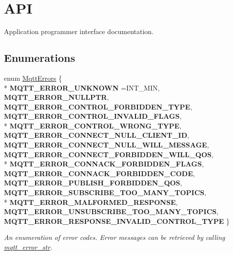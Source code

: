 \hypertarget{group__api}{}\section{A\+PI}
\label{group__api}


Application programmer interface documentation.  


\subsection*{Enumerations}
\begin{DoxyCompactItemize}
\item 
enum \hyperlink{group__api_gabfef25ed21446904fd8b3a71cfa1f203}{Mqtt\+Errors} \{ \\*
{\bfseries M\+Q\+T\+T\+\_\+\+E\+R\+R\+O\+R\+\_\+\+U\+N\+K\+N\+O\+WN} =I\+N\+T\+\_\+\+M\+IN, 
{\bfseries M\+Q\+T\+T\+\_\+\+E\+R\+R\+O\+R\+\_\+\+N\+U\+L\+L\+P\+TR}, 
{\bfseries M\+Q\+T\+T\+\_\+\+E\+R\+R\+O\+R\+\_\+\+C\+O\+N\+T\+R\+O\+L\+\_\+\+F\+O\+R\+B\+I\+D\+D\+E\+N\+\_\+\+T\+Y\+PE}, 
{\bfseries M\+Q\+T\+T\+\_\+\+E\+R\+R\+O\+R\+\_\+\+C\+O\+N\+T\+R\+O\+L\+\_\+\+I\+N\+V\+A\+L\+I\+D\+\_\+\+F\+L\+A\+GS}, 
\\*
{\bfseries M\+Q\+T\+T\+\_\+\+E\+R\+R\+O\+R\+\_\+\+C\+O\+N\+T\+R\+O\+L\+\_\+\+W\+R\+O\+N\+G\+\_\+\+T\+Y\+PE}, 
{\bfseries M\+Q\+T\+T\+\_\+\+E\+R\+R\+O\+R\+\_\+\+C\+O\+N\+N\+E\+C\+T\+\_\+\+N\+U\+L\+L\+\_\+\+C\+L\+I\+E\+N\+T\+\_\+\+ID}, 
{\bfseries M\+Q\+T\+T\+\_\+\+E\+R\+R\+O\+R\+\_\+\+C\+O\+N\+N\+E\+C\+T\+\_\+\+N\+U\+L\+L\+\_\+\+W\+I\+L\+L\+\_\+\+M\+E\+S\+S\+A\+GE}, 
{\bfseries M\+Q\+T\+T\+\_\+\+E\+R\+R\+O\+R\+\_\+\+C\+O\+N\+N\+E\+C\+T\+\_\+\+F\+O\+R\+B\+I\+D\+D\+E\+N\+\_\+\+W\+I\+L\+L\+\_\+\+Q\+OS}, 
\\*
{\bfseries M\+Q\+T\+T\+\_\+\+E\+R\+R\+O\+R\+\_\+\+C\+O\+N\+N\+A\+C\+K\+\_\+\+F\+O\+R\+B\+I\+D\+D\+E\+N\+\_\+\+F\+L\+A\+GS}, 
{\bfseries M\+Q\+T\+T\+\_\+\+E\+R\+R\+O\+R\+\_\+\+C\+O\+N\+N\+A\+C\+K\+\_\+\+F\+O\+R\+B\+I\+D\+D\+E\+N\+\_\+\+C\+O\+DE}, 
{\bfseries M\+Q\+T\+T\+\_\+\+E\+R\+R\+O\+R\+\_\+\+P\+U\+B\+L\+I\+S\+H\+\_\+\+F\+O\+R\+B\+I\+D\+D\+E\+N\+\_\+\+Q\+OS}, 
{\bfseries M\+Q\+T\+T\+\_\+\+E\+R\+R\+O\+R\+\_\+\+S\+U\+B\+S\+C\+R\+I\+B\+E\+\_\+\+T\+O\+O\+\_\+\+M\+A\+N\+Y\+\_\+\+T\+O\+P\+I\+CS}, 
\\*
{\bfseries M\+Q\+T\+T\+\_\+\+E\+R\+R\+O\+R\+\_\+\+M\+A\+L\+F\+O\+R\+M\+E\+D\+\_\+\+R\+E\+S\+P\+O\+N\+SE}, 
{\bfseries M\+Q\+T\+T\+\_\+\+E\+R\+R\+O\+R\+\_\+\+U\+N\+S\+U\+B\+S\+C\+R\+I\+B\+E\+\_\+\+T\+O\+O\+\_\+\+M\+A\+N\+Y\+\_\+\+T\+O\+P\+I\+CS}, 
{\bfseries M\+Q\+T\+T\+\_\+\+E\+R\+R\+O\+R\+\_\+\+R\+E\+S\+P\+O\+N\+S\+E\+\_\+\+I\+N\+V\+A\+L\+I\+D\+\_\+\+C\+O\+N\+T\+R\+O\+L\+\_\+\+T\+Y\+PE}
 \}\begin{DoxyCompactList}\small\item\em An enumeration of error codes. Error messages can be retrieved by calling \hyperlink{group__api_ga6f0b3e9a177b03d5909e4f653fcd4038}{mqtt\+\_\+error\+\_\+str}. \end{DoxyCompactList}
\end{DoxyCompactItemize}
